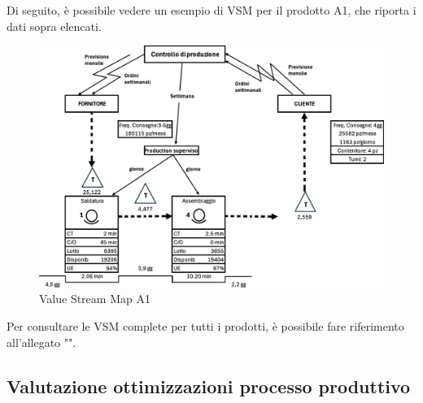 \documentclass[11pt]{article}
\begin{document}
\noindent
Di seguito, è possibile vedere un esempio di VSM per il prodotto A1, che riporta i dati sopra elencati.
\begin{figure}[H]
    \centering
    \includegraphics[width=\textwidth]{images/Value Stream Map A1.png}
    \caption{Value Stream Map A1}
    \label{fig: Value Stream Map A1}
\end{figure}

\noindent
Per consultare le VSM complete per tutti i prodotti, è possibile fare riferimento all'allegato "".
\newpage

\subsection{Valutazione ottimizzazioni processo produttivo}
\end{document}
